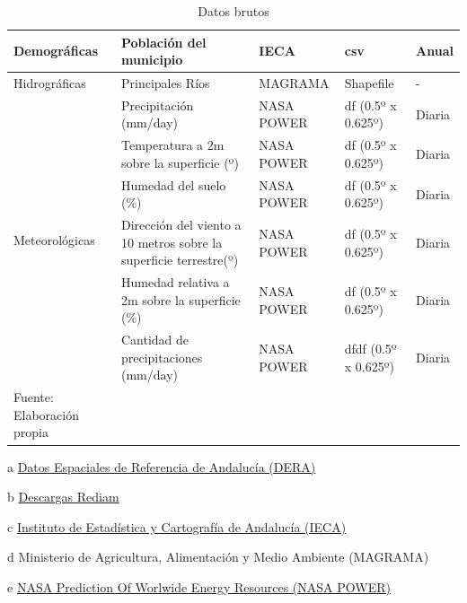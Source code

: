 \documentclass[12pt,a4paper,]{book}
\numberwithin{dummy}{section}
\theoremstyle{ocrenumbox}
\theoremstyle{blacknumex}
\theoremstyle{blacknumbox}
\theoremstyle{ocrenum}
\theoremstyle{ocrenum}
\begin{document}
\begin{table}
\begin{threeparttable}[]
{\begin{tabular}{lllll}
Demográficas                    & Población del municipio                                        & IECA\tnote{c}       & csv                & Anual      \\ \hline
Hidrográficas                   & Principales Ríos                                               & MAGRAMA\tnote{d}    & Shapefile          & -          \\ \hline
\multirow{6}{*}{Meteorológicas} & Precipitación (mm/day)                                         & NASA POWER\tnote{e} & df (0.5º x 0.625º) & Diaria     \\
                                & Temperatura a 2m sobre la superficie (º)                       & NASA POWER & df (0.5º x 0.625º) & Diaria     \\
                                & Humedad del suelo (\%)                                         & NASA POWER & df (0.5º x 0.625º) & Diaria     \\
                                & Dirección del viento a 10 metros sobre la superficie terrestre(º) & NASA POWER & df (0.5º x 0.625º) & Diaria     \\
                                & Humedad relativa a 2m sobre la superficie (\%)                 & NASA POWER & df (0.5º x 0.625º) & Diaria     \\
                                & Cantidad de precipitaciones (mm/day)                           & NASA POWER & dfdf (0.5º x 0.625º) & Diaria     \\ \hline
\footnotesize Fuente: Elaboración propia
\end{tabular}}
\begin{tablenotes}
\raggedright
\item[a] {\footnotesize \href{https://www.juntadeandalucia.es/institutodeestadisticaycartografia/dega/datos-espaciales-de-referencia-de-andalucia-dera/descarga-de-informacion}{Datos Espaciales de Referencia de Andalucía (DERA)}}
\item[b] {\footnotesize \href{https://portalrediam.cica.es/descargas?path=%2F}{Descargas Rediam}}%
\item[c] {\footnotesize \href{https://www.juntadeandalucia.es/institutodeestadisticaycartografia/dega/}{Instituto de Estadística y Cartografía de Andalucía (IECA)}}
\item[d] {\footnotesize Ministerio de Agricultura, Alimentación y Medio Ambiente (MAGRAMA)}
\item[e] {\footnotesize \href{https://power.larc.nasa.gov/#resources}{NASA Prediction Of Worlwide Energy Resources (NASA POWER)}}
\end{tablenotes}
\caption{Datos brutos}
\label{tab:fuentes}
\end{threeparttable}
\end{table}
\end{document}
